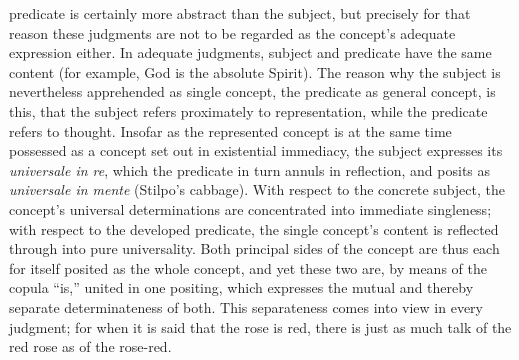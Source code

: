 \documentclass[12pt]{book}
\begin{document}
predicate is certainly more abstract than the subject, but precisely for
that reason these judgments are not to be regarded as the concept's adequate
expression either. In adequate judgments, subject and predicate have the
same content (for example, God is the absolute Spirit). The reason why the
subject is nevertheless apprehended as single concept, the predicate as
general concept, is this, that the subject refers proximately to
representation, while the predicate refers to thought. Insofar as the
represented concept is at the same time possessed as a concept set out in
existential immediacy, the subject expresses its \textit{universale in re},
which the predicate in turn annuls in reflection, and posits as
\textit{universale in mente} (Stilpo's cabbage). With respect to the
concrete subject, the concept's universal determinations are concentrated
into immediate singleness; with respect to the developed predicate, the
single concept's content is reflected through into pure universality. Both
principal sides of the concept are thus each for itself posited as the whole
concept, and yet these two are, by means of the copula ``is,'' united in one
positing, which expresses the mutual and thereby separate determinateness of
both. This separateness comes into view in every judgment; for when it is
said that the rose is red, there is just as much talk of the red rose as of
the rose-red.
\end{document}
